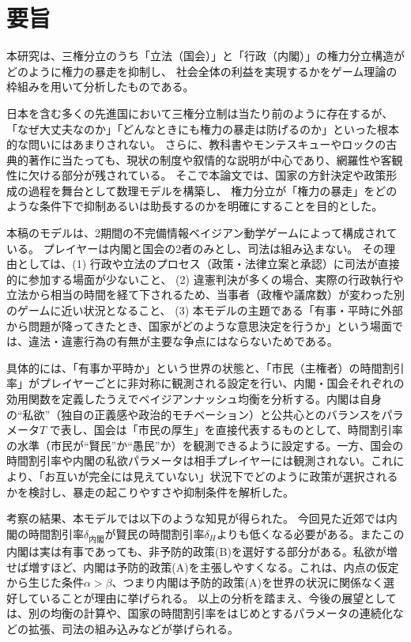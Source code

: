 \documentclass[main.tex]{subfiles}
\begin{document}
\section*{要旨}

本研究は、三権分立のうち「立法（国会）」と「行政（内閣）」の権力分立構造がどのように権力の暴走を抑制し、
社会全体の利益を実現するかをゲーム理論の枠組みを用いて分析したものである。

日本を含む多くの先進国において三権分立制は当たり前のように存在するが、「なぜ大丈夫なのか」「どんなときにも権力の暴走は防げるのか」といった根本的な問いにはあまりされない。
さらに、教科書やモンテスキューやロックの古典的著作に当たっても、現状の制度や叙情的な説明が中心であり、網羅性や客観性に欠ける部分が残されている。
そこで本論文では、国家の方針決定や政策形成の過程を舞台として数理モデルを構築し、
権力分立が「権力の暴走」をどのような条件下で抑制あるいは助長するのかを明確にすることを目的とした。

本稿のモデルは、2期間の不完備情報ベイジアン動学ゲームによって構成されている。
プレイヤーは内閣と国会の2者のみとし、司法は組み込まない。
その理由としては、(1) 行政や立法のプロセス（政策・法律立案と承認）に司法が直接的に参加する場面が少ないこと、
(2) 違憲判決が多くの場合、実際の行政執行や立法から相当の時間を経て下されるため、当事者（政権や議席数）が変わった別のゲームに近い状況となること、
(3) 本モデルの主題である「有事・平時に外部から問題が降ってきたとき、国家がどのような意思決定を行うか」という場面では、違法・違憲行為の有無が主要な争点にはならないためである。

具体的には、「有事か平時か」という世界の状態と、「市民（主権者）の時間割引率」がプレイヤーごとに非対称に観測される設定を行い、内閣・国会それぞれの効用関数を定義したうえでベイジアンナッシュ均衡を分析する。内閣は自身の“私欲”（独自の正義感や政治的モチベーション）と公共心とのバランスをパラメータ$T$
で表し、国会は「市民の厚生」を直接代表するものとして、時間割引率の水準（市民が“賢民”か“愚民”か）を観測できるように設定する。一方、国会の時間割引率や内閣の私欲パラメータは相手プレイヤーには観測されない。これにより、「お互いが完全には見えていない」状況下でどのように政策が選択されるかを検討し、暴走の起こりやすさや抑制条件を解析した。

考察の結果、本モデルでは以下のような知見が得られた。
今回見た近郊では内閣の時間割引率$\delta_{内閣}$が賢民の時間割引率$\delta_H$よりも低くなる必要がある。またこの内閣は実は有事であっても、非予防的政策(B)を選好する部分がある。私欲が増せば増すほど、内閣は予防的政策(A)を主張しやすくなる。これは、内点の仮定から生じた条件$\alpha>\beta$、つまり内閣は予防的政策(A)を世界の状況に関係なく選好していることが理由に挙げられる。
以上の分析を踏まえ、今後の展望としては、別の均衡の計算や、国家の時間割引率をはじめとするパラメータの連続化などの拡張、司法の組み込みなどが挙げられる。
\end{document}
